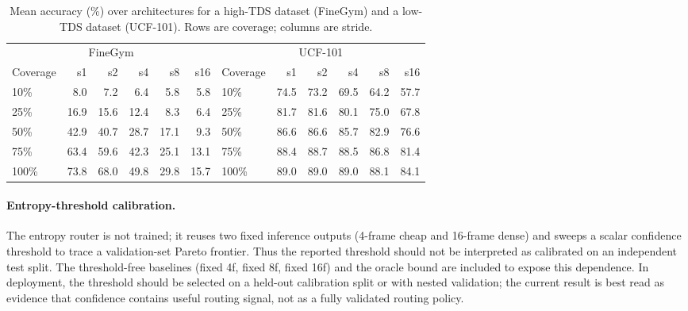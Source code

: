 \documentclass[runningheads]{llncs}
\newcommand{\tabtight}{\setlength{\tabcolsep}{3.5pt}\renewcommand{\arraystretch}{1.12}}
\newcommand{\TDS}{\textsc{TDS}}
\begin{document}
\begin{table}[!htbp]
\centering
\caption{Mean accuracy (\%) over architectures for a high-\TDS{} dataset (FineGym) and a low-\TDS{} dataset (UCF-101). Rows are coverage; columns are stride.}
\label{tab:coverage_stride_examples}
\scriptsize\tabtight
\begin{adjustbox}{max width=\textwidth}
\begin{tabular}{l rrrrr @{\hskip18pt} l rrrrr}
\toprule
\multicolumn{6}{c}{FineGym} & \multicolumn{6}{c}{UCF-101} \\
\cmidrule(lr){1-6}\cmidrule(lr){7-12}
Coverage & s1 & s2 & s4 & s8 & s16 & Coverage & s1 & s2 & s4 & s8 & s16 \\
\midrule
10\%  &  8.0 &  7.2 &  6.4 &  5.8 &  5.8 & 10\%  & 74.5 & 73.2 & 69.5 & 64.2 & 57.7 \\
25\%  & 16.9 & 15.6 & 12.4 &  8.3 &  6.4 & 25\%  & 81.7 & 81.6 & 80.1 & 75.0 & 67.8 \\
50\%  & 42.9 & 40.7 & 28.7 & 17.1 &  9.3 & 50\%  & 86.6 & 86.6 & 85.7 & 82.9 & 76.6 \\
75\%  & 63.4 & 59.6 & 42.3 & 25.1 & 13.1 & 75\%  & 88.4 & 88.7 & 88.5 & 86.8 & 81.4 \\
100\% & 73.8 & 68.0 & 49.8 & 29.8 & 15.7 & 100\% & 89.0 & 89.0 & 89.0 & 88.1 & 84.1 \\
\bottomrule
\end{tabular}
\end{adjustbox}
\end{table}

\paragraph{Entropy-threshold calibration.}
The entropy router is not trained; it reuses two fixed inference outputs (4-frame cheap and 16-frame dense) and sweeps a scalar confidence threshold to trace a validation-set Pareto frontier. Thus the reported threshold should not be interpreted as calibrated on an independent test split. The threshold-free baselines (fixed 4f, fixed 8f, fixed 16f) and the oracle bound are included to expose this dependence. In deployment, the threshold should be selected on a held-out calibration split or with nested validation; the current result is best read as evidence that confidence contains useful routing signal, not as a fully validated routing policy.



\end{document}
